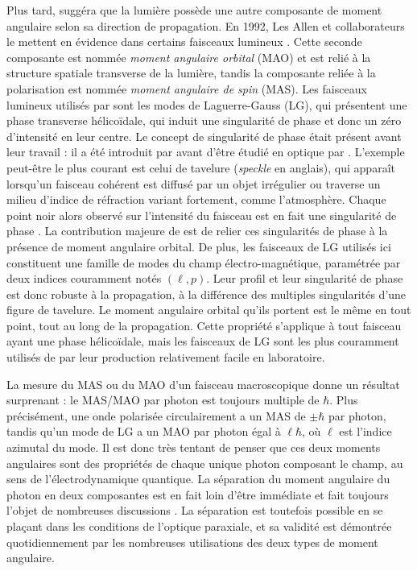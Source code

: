 Plus tard,  suggéra que la lumière possède une autre composante de moment angulaire selon sa direction de propagation. En 1992, Les Allen et collaborateurs le mettent en évidence dans certains faisceaux lumineux . Cette seconde composante est nommée \textit{moment angulaire orbital} (MAO) et est relié à la structure spatiale transverse de la lumière, tandis la composante reliée à la polarisation est nommée \textit{moment angulaire de spin} (MAS). Les faisceaux lumineux utilisés par  sont les modes de Laguerre-Gauss (LG), qui présentent une phase transverse hélicoïdale, qui induit une singularité de phase et donc un zéro d'intensité en leur centre. Le concept de singularité de phase était présent avant leur travail : il a été introduit par  avant d'être étudié en optique par . L'exemple peut-être le plus courant est celui de tavelure (\textit{speckle} en anglais), qui apparaît lorsqu'un faisceau cohérent est diffusé par un objet irrégulier ou traverse un milieu d'indice de réfraction variant fortement, comme l'atmosphère. Chaque point noir alors observé sur l'intensité du faisceau est en fait une singularité de phase . La contribution majeure de  est de relier ces singularités de phase à la présence de moment angulaire orbital. De plus, les faisceaux de LG utilisés ici constituent une famille de modes du champ électro-magnétique, paramétrée par deux indices couramment notés $(\ell,p)$. Leur profil et leur singularité de phase est donc robuste à la propagation, à la différence des multiples singularités d'une figure de tavelure. Le moment angulaire orbital qu'ils portent est le même en tout point, tout au long de la propagation. Cette propriété s'applique à tout faisceau ayant une phase hélicoïdale, mais les faisceaux de LG sont les plus couramment utilisés de par leur production relativement facile en laboratoire. %

La mesure du MAS ou du MAO d'un faisceau macroscopique donne un résultat surprenant : le MAS/MAO par photon est toujours multiple de $\hbar$. Plus précisément, une onde polarisée circulairement a un MAS de $\pm \hbar$ par photon, tandis qu'un mode de LG a un MAO par photon égal à $\ell \hbar$, où $\ell$ est l'indice azimutal du mode. Il est donc très tentant de penser que ces deux moments angulaires sont des propriétés de chaque unique photon composant le champ, au sens de l'électrodynamique quantique. La séparation du moment angulaire du photon en deux composantes est en fait loin d'être immédiate  et fait toujours l'objet de nombreuses discussions . La séparation est toutefois possible en se plaçant dans les conditions de l'optique paraxiale, et sa validité est démontrée quotidiennement par les nombreuses utilisations des deux types de moment angulaire.

